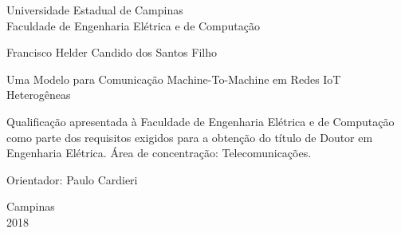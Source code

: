 
\begin{center}
\large Universidade Estadual de Campinas\\
Faculdade de Engenharia Elétrica e de Computação
\end{center}

\vspace*{1.5cm}
\begin{center}
\large Francisco Helder Candido dos Santos Filho
\end{center}


\vspace*{2.3cm}

\begin{center}
{\sc  Uma Modelo para Comunicação Machine-To-Machine em Redes IoT Heterogêneas}
\end{center}

\vspace*{3.0cm}

\begin{flushright}
\begin{minipage}{9.0cm}
Qualificação apresentada à Faculdade de Engenharia Elétrica e de Computação como  parte dos requisitos exigidos para a obtenção do título de Doutor em Engenharia Elétrica. Área de concentração: Telecomunicações. 

\vspace*{0.5cm}
Orientador: Paulo Cardieri

\end{minipage}
\end{flushright}

\null \vfill

\vspace*{0.5cm}

\begin{center}
Campinas\\2018
\end{center}